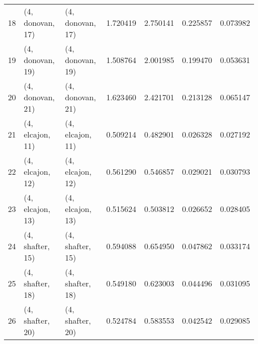\begin{tabular}{lllrrrr}
18 &  (4, donovan, 17) &  (4, donovan, 17) &  1.720419 &  2.750141 &   0.225857 &  0.073982 \\
19 &  (4, donovan, 19) &  (4, donovan, 19) &  1.508764 &  2.001985 &   0.199470 &  0.053631 \\
20 &  (4, donovan, 21) &  (4, donovan, 21) &  1.623460 &  2.421701 &   0.213128 &  0.065147 \\
21 &  (4, elcajon, 11) &  (4, elcajon, 11) &  0.509214 &  0.482901 &   0.026328 &  0.027192 \\
22 &  (4, elcajon, 12) &  (4, elcajon, 12) &  0.561290 &  0.546857 &   0.029021 &  0.030793 \\
23 &  (4, elcajon, 13) &  (4, elcajon, 13) &  0.515624 &  0.503812 &   0.026652 &  0.028405 \\
24 &  (4, shafter, 15) &  (4, shafter, 15) &  0.594088 &  0.654950 &   0.047862 &  0.033174 \\
25 &  (4, shafter, 18) &  (4, shafter, 18) &  0.549180 &  0.623003 &   0.044496 &  0.031095 \\
26 &  (4, shafter, 20) &  (4, shafter, 20) &  0.524784 &  0.583553 &   0.042542 &  0.029085 \\
\bottomrule
\end{tabular}
